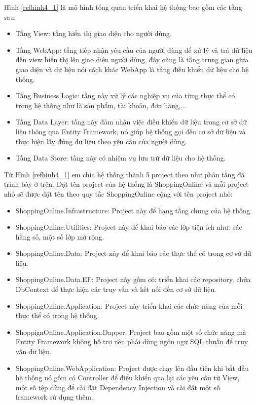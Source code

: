 \par
Hình \ref{refhinh4_1} là mô hình tổng quan triển khai hệ thống bao gồm các tầng sau:
\begin{itemize}
\item Tầng View: tầng hiển thị giao diện cho người dùng.
\item Tầng WebApp: tầng tiếp nhận yêu cầu của người dùng để xử lý và trả dữ liệu đến view hiển thị lên giao diện người dùng, đây cũng là tầng trung gian giữa giao diện và dữ liệu nói cách khác WebApp là tầng điều khiển dữ liệu cho hệ thống.
\item Tầng Business Logic: tầng này xử lý các nghiệp vụ của từng thực thể có trong hệ thống như là sản phẩm, tài khoản, đơn hàng,...
\item Tầng Data Layer: tầng này đảm nhận việc điều khiển dữ liệu trong cơ sở dữ liệu thông qua Entity Framework, nó giúp hệ thống gọi đến cơ sở dữ liệu và thực hiện lấy đúng dữ liệu theo yêu cầu của người dùng.
\item Tầng Data Store: tầng này có nhiệm vụ lưu trữ dữ liệu cho hệ thống.
\end{itemize}
\par
Từ Hình \ref{refhinh4_1} em chia hệ thống thành 5 project theo như phân tầng đã trình bày ở trên. Đặt tên project của hệ thống là ShoppingOnline và mỗi project nhỏ sẽ được đặt tên theo quy tắc ShoppingOnline cộng với tên project nhỏ:
\begin{itemize}
\item ShoppingOnline.Infrastructure: Project này để hạng tầng chung của hệ thống.
\item ShoppingOnline.Utilities: Project này để khai báo các lớp tiện ích như: các hằng số, một số lớp mở rộng.
\item ShoppingOnline.Data: Project này để khai báo các thực thể có trong cơ sở dữ liệu.
\item ShoppingOnline.Data.EF: Project này gồm có: triển khai các repository, chứa DbContext  để thực hiện các truy vấn và kết nối đến cơ sở dữ liệu.
\item ShoppingOnline.Application: Project này triển khai các chức năng của mỗi thực thể có trong hệ thống.
\item ShoppignOnline.Application.Dapper: Project bao gồm một số chức năng mà Entity Framework không hỗ trợ nên phải dùng ngôn ngữ SQL thuần để truy vấn dữ liệu.
\item ShoppingOnline.WebApplication: Project được chạy lên đầu tiên khi bắt đầu hệ thống nó gồm có Controller để điểu khiển qua lại các yêu cầu từ View, một số tệp dùng để cài đặt Dependency Injection và cài đặt một số framework sử dụng thêm. 
\end{itemize}

